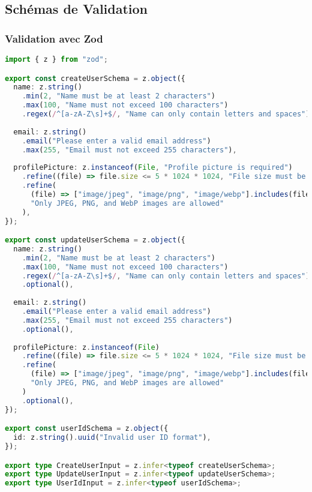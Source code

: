 \subsection{Schémas de Validation}

\subsubsection{Validation avec Zod}

\begin{lstlisting}[language=TypeScript, caption=Schémas de validation Zod]
import { z } from "zod";

export const createUserSchema = z.object({
  name: z.string()
    .min(2, "Name must be at least 2 characters")
    .max(100, "Name must not exceed 100 characters")
    .regex(/^[a-zA-Z\s]+$/, "Name can only contain letters and spaces"),
  
  email: z.string()
    .email("Please enter a valid email address")
    .max(255, "Email must not exceed 255 characters"),
  
  profilePicture: z.instanceof(File, "Profile picture is required")
    .refine((file) => file.size <= 5 * 1024 * 1024, "File size must be less than 5MB")
    .refine(
      (file) => ["image/jpeg", "image/png", "image/webp"].includes(file.type),
      "Only JPEG, PNG, and WebP images are allowed"
    ),
});

export const updateUserSchema = z.object({
  name: z.string()
    .min(2, "Name must be at least 2 characters")
    .max(100, "Name must not exceed 100 characters")
    .regex(/^[a-zA-Z\s]+$/, "Name can only contain letters and spaces")
    .optional(),
  
  email: z.string()
    .email("Please enter a valid email address")
    .max(255, "Email must not exceed 255 characters")
    .optional(),
  
  profilePicture: z.instanceof(File)
    .refine((file) => file.size <= 5 * 1024 * 1024, "File size must be less than 5MB")
    .refine(
      (file) => ["image/jpeg", "image/png", "image/webp"].includes(file.type),
      "Only JPEG, PNG, and WebP images are allowed"
    )
    .optional(),
});

export const userIdSchema = z.object({
  id: z.string().uuid("Invalid user ID format"),
});

export type CreateUserInput = z.infer<typeof createUserSchema>;
export type UpdateUserInput = z.infer<typeof updateUserSchema>;
export type UserIdInput = z.infer<typeof userIdSchema>;
\end{lstlisting}

